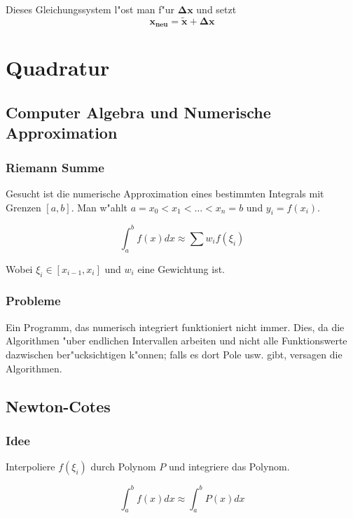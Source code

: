 \documentclass[german, 10pt, a4paper, twocolumn]{scrartcl}
\theoremstyle{definition}
\begin{document}
Dieses Gleichungssystem l"ost man f"ur $\mathbf{\Delta x}$ und setzt
\begin{displaymath}
	\mathbf{x_{neu}} = \mathbf{\widetilde{x}} + \mathbf{\Delta x}
\end{displaymath}

\section{Quadratur}

\subsection{Computer Algebra und Numerische Approximation}

\subsubsection{Riemann Summe}

Gesucht ist die numerische Approximation eines bestimmten Integrals mit Grenzen $[a,b]$. Man w"ahlt $a = x_0 < x_1 < \ldots < x_n = b$ und $y_i = f(x_i)$.

\begin{displaymath}
	\int^b_a f(x) dx \approx \sum w_i f(\xi_i)
\end{displaymath}

Wobei $\xi_i \in [x_{i-1}, x_i]$ und $w_i$ eine Gewichtung ist.

\subsubsection{Probleme}

Ein Programm, das numerisch integriert funktioniert nicht immer. Dies, da die Algorithmen "uber endlichen Intervallen arbeiten und nicht alle Funktionswerte dazwischen ber"ucksichtigen k"onnen; falls es dort Pole usw. gibt, versagen die Algorithmen.

\subsection{Newton-Cotes}

\subsubsection{Idee}

Interpoliere $f(\xi_i)$ durch Polynom $P$ und integriere das Polynom.

\begin{displaymath}
	\int^b_a f(x)dx \approx \int^b_a P(x)dx
\end{displaymath}
\end{document}
